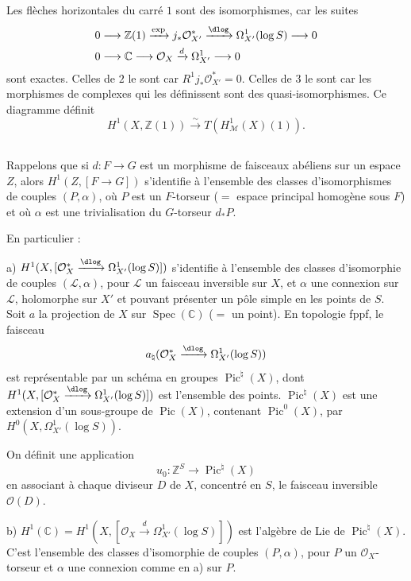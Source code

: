 \documentclass[12pt,a4paper]{amsart}
\theoremstyle{plain}
\theoremstyle{definition}
\theoremstyle{remark}
\DeclareMathOperator{\Pic}{Pic}
\DeclareMathOperator{\Spec}{Spec}
\numberwithin{equation}{section}
\begin{document}
Les flèches horizontales du carré $1$ sont des isomorphismes, car les suites
\begin{align*}
0 &\longrightarrow \mathbb{Z}(1) \xrightarrow{\exp} j_*\mathcal{O}_{X'}^* \xrightarrow{\dlog} \Omega_{X'}^1(\log S) \longrightarrow 0 \\
0 &\longrightarrow \mathbb{C} \longrightarrow \mathcal{O}_X \xrightarrow{d} \Omega_{X'}^1 \longrightarrow 0
\end{align*}
sont exactes. Celles de $2$ le sont car $R^1j_*\mathcal{O}_{X'}^*=0$. Celles de $3$ le sont car les morphismes de complexes qui les définissent sont des quasi-isomorphismes. Ce diagramme définit
\[
H^1(X,\mathbb{Z}(1))\xrightarrow{\sim}T(H_\mathscr{M}^1(X)(1)).
\]

\subsection{}\label{10.3.10}
Rappelons que si $d:F\to G$ est un morphisme de faisceaux abéliens sur un espace $Z$, alors $H^1(Z,[F\to G])$ s'identifie à l'ensemble des classes d'isomorphismes de couples $(P,\alpha)$, où $P$ est un $F$-torseur ($=$ espace principal homogène sous $F$) et où $\alpha$ est une trivialisation du $G$-torseur $d_*P$.

En particulier :

a) $H^1(X,[\mathcal{O}_X^*\xrightarrow{\dlog}\Omega_{X'}^1(\log S)])$ s'identifie à l'ensemble des classes d'isomorphie de couples $(\mathscr{L},\alpha)$, pour $\mathscr{L}$ un faisceau inversible sur $X$, et $\alpha$ une connexion sur $\mathscr{L}$, holomorphe sur $X'$ et pouvant présenter un pôle simple en les points de $S$. Soit $a$ la projection de $X$ sur $\Spec(\mathbb{C})$ ($=$ un point). En topologie fppf, le faisceau
\[
a_\natural(\mathcal{O}_X^*\xrightarrow{\dlog}\Omega_{X'}^1(\log S))
\]
est représentable par un schéma en groupes $\Pic^\natural(X)$, dont $H^1(X,[\mathcal{O}_X^*\xrightarrow{\dlog}\Omega_{X'}^1(\log S)])$ est l'ensemble des points. $\Pic^\natural(X)$ est une extension d'un sous-groupe de $\Pic(X)$, contenant $\Pic^0(X)$, par $H^0(X,\Omega_{X'}^1(\log S))$.

On définit une application
\begin{equation}\label{eq:10.3.10.1}
u_0:\mathbb{Z}^S\to\Pic^\natural(X)
\end{equation}
en associant à chaque diviseur $D$ de $X$, concentré en $S$, le faisceau inversible $\mathcal{O}(D)$.

b) $H^1(\mathbb{C})=H^1(X,[\mathcal{O}_X\xrightarrow{d}\Omega_{X'}^1(\log S)])$ est l'algèbre de Lie de $\Pic^\natural(X)$. C'est l'ensemble des classes d'isomorphie de couples $(P,\alpha)$, pour $P$ un $\mathcal{O}_X$-torseur et $\alpha$ une connexion comme en a) sur $P$.
\end{document}
